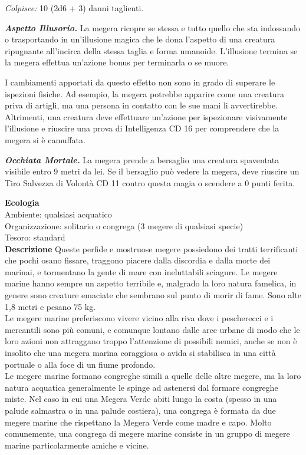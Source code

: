 \begin{multicols}{2}
\emph{Colpisce:} 10 (2d6 + 3) danni taglienti.

\emph{\textbf{Aspetto Illusorio.}} La megera ricopre se stessa e tutto
quello che sta indossando o trasportando in un'illusione magica che le
dona l'aspetto di una creatura ripugnante all'incirca della stessa
taglia e forma umanoide. L'illusione termina se la megera effettua
un'azione bonus per terminarla o se muore.

I cambiamenti apportati da questo effetto non sono in grado di superare le ispezioni fisiche. Ad esempio, la megera potrebbe apparire come una creatura priva di artigli, ma una persona in contatto con le sue mani li avvertirebbe. Altrimenti, una creatura deve effettuare un'azione per ispezionare visivamente l'illusione e riuscire una prova di Intelligenza CD 16 per comprendere che la megera si è camuffata.

\emph{\textbf{Occhiata Mortale.}} La megera prende a bersaglio una creatura spaventata visibile entro 9 metri da lei. Se il bersaglio può vedere la megera, deve riuscire un Tiro Salvezza di Volontà CD 11 contro questa magia o scendere a 0 punti ferita.

\textbf{Ecologia}\\
Ambiente: qualsiasi acquatico\\
Organizzazione: solitario o congrega (3 megere di qualsiasi specie)\\
Tesoro: standard\\
\textbf{Descrizione}
Queste perfide e mostruose megere possiedono dei tratti terrificanti che pochi osano fissare, traggono piacere dalla discordia e dalla morte dei marinai, e tormentano la gente di mare con ineluttabili sciagure. Le megere marine hanno sempre un aspetto terribile e, malgrado la loro natura famelica, in genere sono creature emaciate che sembrano sul punto di morir di fame. Sono alte 1,8 metri e pesano 75 kg.\\

Le megere marine preferiscono vivere vicino alla riva dove i pescherecci e i mercantili sono più comuni, e comunque lontano dalle aree urbane di modo che le loro azioni non attraggano troppo l'attenzione di possibili nemici, anche se non è insolito che una megera marina coraggiosa o avida si stabilisca in una città portuale o alla foce di un fiume profondo.\\

Le megere marine formano congreghe simili a quelle delle altre megere, ma la loro natura acquatica generalmente le spinge ad astenersi dal formare congreghe miste. Nel caso in cui una Megera Verde abiti lungo la costa (spesso in una palude salmastra o in una palude costiera), una congrega è formata da due megere marine che rispettano la Megera Verde come madre e capo. Molto comunemente, una congrega di megere marine consiste in un gruppo di megere marine particolarmente amiche e vicine.\\



\end{multicols}
